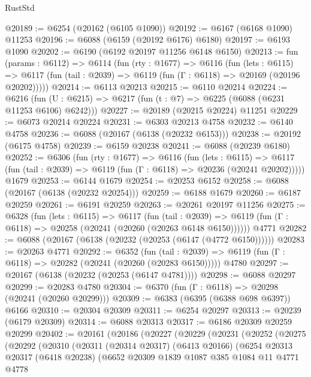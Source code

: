 \begin{lexlean}{RustStd}
\begin{coremodule}
@20189 := @6254 (@20162 (@6105 @1090))
@20192 := @6167 (@6168 @1090) @11253
@20196 := @6088 (@6159 (@20192 @6176) @6180)
@20197 := @6193 @1090
@20202 := @6190 (@6192 @20197 @11256 @6148 @6150)
@20213 := fun (params : @6112) =>
  @6114
    (fun (rty : @1677) =>
    @6116
      (fun (lets : @6115) =>
      @6117 (fun (tail : @2039) => @6119 (fun (Γ : @6118) => @20169 (@20196 @20202)))))
@20214 := @6113 @20213
@20215 := @6110 @20214
@20224 := @6216
    (fun (U : @6215) => @6217 (fun (t : @7) => @6225 (@6088 (@6231 @11253 @6106) @6242)))
@20227 := @20189 (@20215 @20224) @11251
@20229 := @6073 @20214 @20224
@20231 := @6303 @20213 @4758
@20232 := @6140 @4758
@20236 := @6088 (@20167 (@6138 (@20232 @6153)))
@20238 := @20192 (@6175 @4758)
@20239 := @6159 @20238
@20241 := @6088 (@20239 @6180)
@20252 := @6306
    (fun (rty : @1677) =>
    @6116
      (fun (lets : @6115) =>
      @6117 (fun (tail : @2039) => @6119 (fun (Γ : @6118) => @20236 (@20241 @20202)))))
    @1679
@20253 := @6144 @1679
@20254 := @20253 @6152
@20258 := @6088 (@20167 (@6138 (@20232 @20254)))
@20259 := @6188 @1679
@20260 := @6187 @20259
@20261 := @6191 @20259
@20263 := @20261 @20197 @11256
@20275 := @6328
    (fun (lets : @6115) =>
    @6117
      (fun (tail : @2039) =>
      @6119 (fun (Γ : @6118) => @20258 (@20241 (@20260 (@20263 @6148 @6150))))))
    @4771
@20282 := @6088 (@20167 (@6138 (@20232 (@20253 (@6147 (@4772 @6150))))))
@20283 := @20263 @4771
@20292 := @6352
    (fun (tail : @2039) => @6119 (fun (Γ : @6118) => @20282 (@20241 (@20260 (@20283 @6150)))))
    @4780
@20297 := @20167 (@6138 (@20232 (@20253 (@6147 @4781))))
@20298 := @6088 @20297
@20299 := @20283 @4780
@20304 := @6370 (fun (Γ : @6118) => @20298 (@20241 (@20260 @20299)))
@20309 := @6383 (@6395 (@6388 @698 @6397)) @6166
@20310 := @20304 @20309
@20311 := @6254 @20297
@20313 := @20239 (@6179 @20309)
@20314 := @6088 @20313
@20317 := @6186 @20309 @20259 @20299
@20402 := @20161
    (@20186
      (@20227
        (@20229
          (@20231
            (@20252
              (@20275
                (@20292
                  (@20310
                    (@20311
                      (@20314 @20317)
                      (@6413 @20166)
                      (@6254
                        @20313
                        @20317
                        (@6418 @20238)
                        (@6652
                          @20309
                          @1839
                          @1087
                          @385
                          @1084
                          @11
                          @4771
                          @4778

\end{coremodule}
\end{lexlean}
